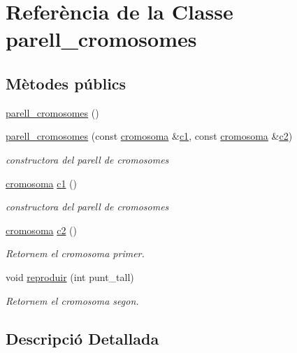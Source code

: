 \hypertarget{classparell__cromosomes}{}\section{Referència de la Classe parell\+\_\+cromosomes}
\label{classparell__cromosomes}
\subsection*{Mètodes públics}
\begin{DoxyCompactItemize}
\item 
\hyperlink{classparell__cromosomes_a9d86452d029f65ccf80c8861c4914698}{parell\+\_\+cromosomes} ()
\item 
\hyperlink{classparell__cromosomes_ac03872e98719667206d6b9f6e002f2df}{parell\+\_\+cromosomes} (const \hyperlink{classcromosoma}{cromosoma} \&\hyperlink{classparell__cromosomes_af9f8dd9154e1c23176a9b4fc99876d2c}{c1}, const \hyperlink{classcromosoma}{cromosoma} \&\hyperlink{classparell__cromosomes_aeef1645e5ce4276c9b33efefb0fde5fa}{c2})
\begin{DoxyCompactList}\small\item\em constructora del parell de cromosomes \end{DoxyCompactList}\item 
\hyperlink{classcromosoma}{cromosoma} \hyperlink{classparell__cromosomes_af9f8dd9154e1c23176a9b4fc99876d2c}{c1} ()
\begin{DoxyCompactList}\small\item\em constructora del parell de cromosomes \end{DoxyCompactList}\item 
\hyperlink{classcromosoma}{cromosoma} \hyperlink{classparell__cromosomes_aeef1645e5ce4276c9b33efefb0fde5fa}{c2} ()
\begin{DoxyCompactList}\small\item\em Retornem el cromosoma primer. \end{DoxyCompactList}\item 
void \hyperlink{classparell__cromosomes_a70760dca0beb7da1d59f70d8cfca83a5}{reproduir} (int punt\+\_\+tall)
\begin{DoxyCompactList}\small\item\em Retornem el cromosoma segon. \end{DoxyCompactList}\end{DoxyCompactItemize}


\subsection{Descripció Detallada}


